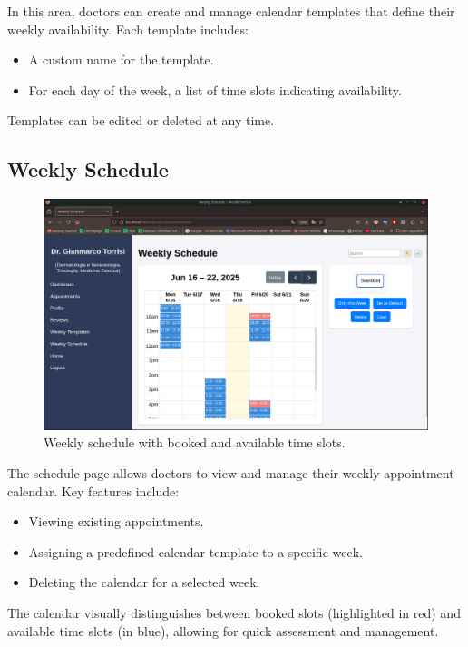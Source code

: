In this area, doctors can create and manage calendar templates that define their weekly availability. Each template includes:
\begin{itemize}
	\item A custom name for the template.
	\item For each day of the week, a list of time slots indicating availability.
\end{itemize}
Templates can be edited or deleted at any time.

\subsection{Weekly Schedule}

\begin{figure}[!h]
	\centering
	\includegraphics[scale=0.30]{resources/screenshots/doctor_ui/schedule.png}
	\caption{Weekly schedule with booked and available time slots.}
	\label{fig:weekly_schedule}
\end{figure}

The schedule page allows doctors to view and manage their weekly appointment calendar. Key features include:
\begin{itemize}
	\item Viewing existing appointments.
	\item Assigning a predefined calendar template to a specific week.
	\item Deleting the calendar for a selected week.
\end{itemize}

The calendar visually distinguishes between booked slots (highlighted in red) and available time slots (in blue), allowing for quick assessment and management.